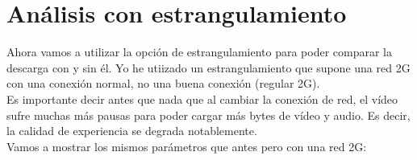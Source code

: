 \documentclass[11pt,a4paper]{article}
\begin{document}
\section{Análisis con estrangulamiento}

Ahora vamos a utilizar la opción de estrangulamiento para poder comparar la descarga con y sin él. Yo he utiizado un estrangulamiento que supone una red 2G con una conexión normal, no una buena conexión (regular 2G).\\

Es importante decir antes que nada que al cambiar la conexión de red, el vídeo sufre muchas más pausas para poder cargar más bytes de vídeo y audio. Es decir, la calidad de experiencia se degrada notablemente.\\

Vamos a mostrar los mismos parámetros que antes pero con una red 2G:
\end{document}
